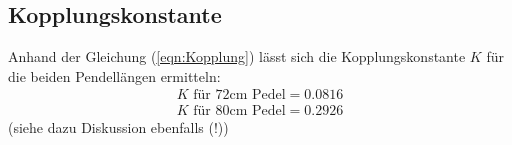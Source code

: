 \subsection{Kopplungskonstante}
Anhand der Gleichung (\ref{eqn:Kopplung}) lässt sich die Kopplungskonstante $K$ für
die beiden Pendellängen ermitteln:
\begin{gather}
    K \textrm{ für 72cm Pedel} = 0.0816\\
    K \textrm{ für 80cm Pedel} = 0.2926
    \label{eqn:kopplung80}
\end{gather}
(siehe dazu Diskussion ebenfalls (!))


